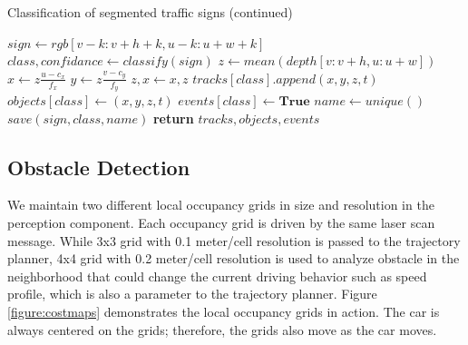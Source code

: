 \begin{algorithm}
\ContinuedFloat
\caption{Classification of segmented traffic signs (continued)}
  \begin{algorithmic}
      \State $sign \gets rgb[v-k:v+h+k, u-k:u+w+k]$
      \State $class, confidance \gets classify(sign)$
        \State $z \gets mean(depth[v:v+h, u:u+w])$
        \State $x \gets z\frac{u-c_x}{f_x}$
        \State $y \gets z\frac{v-c_y}{f_y}$
        \State $z, x \gets x, z$
        \State $tracks[class].append(x, y, z, t)$
          \State $objects[class] \gets (x, y, z, t)$
          \State $events[class] \gets \textbf{True}$
            \State $name \gets unique()$
            \State $save(sign, class, name)$
          \EndIf
        \EndIf
      \EndIf
    \EndFor
    \State \textbf{return} $tracks, objects, events$
    \EndProcedure
  \end{algorithmic}
\end{algorithm}

\subsection{Obstacle Detection}

We maintain two different local occupancy grids in size and resolution in the
perception component. Each occupancy grid is driven by the same laser scan
message. While 3x3 grid with 0.1 meter/cell resolution is passed to the
trajectory planner, 4x4 grid with 0.2 meter/cell resolution is used to analyze
obstacle in the neighborhood that could change the current driving behavior
such as speed profile, which is also a parameter to the trajectory planner.
Figure \ref{figure:costmaps} demonstrates the local occupancy grids in action.
The car is always centered on the grids; therefore, the grids also move as the
car moves.

